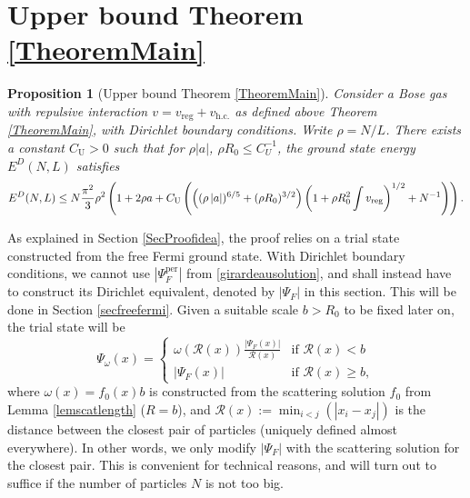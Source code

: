 \documentclass[a4paper,11pt]{article}
\newcommand{\abs}[1]{\left\lvert #1 \right\rvert}
\newcommand{\rr}{\mathcal{R}}
\newtheorem{proposition}[theorem]{Proposition}
\numberwithin{equation}{section}
\begin{document}
\section{Upper bound Theorem \ref{TheoremMain}}	
\label{SecUpperbound} 
	\begin{proposition}[Upper bound Theorem \ref{TheoremMain}]
		\label{PropositionUpperBound}
		Consider a Bose gas with repulsive interaction  $v=v_{\text{reg}}+v_{\text{h.c.}}$ as defined above Theorem \ref{TheoremMain}, with Dirichlet boundary conditions. Write $\rho=N/L$. There exists a constant $C_\text{U}>0$ such that for $\rho|a|$, $\rho R_0\leq C_U^{-1}$, the ground state energy $E^D(N,L)$ satisfies
		\begin{equation}
		\label{equpper}
		E^D(N,L)\leq N\frac{\pi^2}{3}\rho^2\left(1+2\rho a + C_\text{U}\left(\left((\rho\abs{a})^{6/5}+(\rho R_0)^{3/2}\right)\left(1+\rho R_0^2 \int v_{\textnormal{reg}}\right)^{1/2}+N^{-1}\right)\right).
		\end{equation}
	\end{proposition}

As explained in Section \ref{SecProofidea}, the proof relies on a trial state constructed from the free Fermi ground state. With Dirichlet boundary conditions, we cannot use $\abs{\Psi^{\text{per}}_F}$ from \eqref{girardeausolution}, and shall instead have to construct its Dirichlet equivalent, denoted by $\abs{\Psi_F}$ in this section. This will be done in Section \ref{secfreefermi}. Given a suitable scale $ b>R_0 $ to be fixed later on, the trial state will be	
\begin{equation}
\label{psiomega}
\Psi_\omega(x)=\begin{cases}
	\omega(\rr(x))\frac{\abs{\Psi_F(x)}}{\rr(x)}& \text{if }\rr(x)<b\\
	\abs{\Psi_F(x)}&\text{if }\rr(x)\geq b,
	\end{cases}
	\end{equation}  
	where $ \omega(x)=f_0(x)b$ is constructed from the scattering solution $f_0$ from Lemma \ref{lemscatlength} ($R=b$),  and $\rr(x):=\min_{i<j}(\abs{x_i-x_j}) $ is the distance between the closest pair of particles (uniquely defined almost everywhere). In other words, we only modify $|\Psi_F|$ with the scattering solution for the closest pair. This is convenient for technical reasons, and will turn out to suffice if the number of particles $N$ is not too big.
\end{document}
